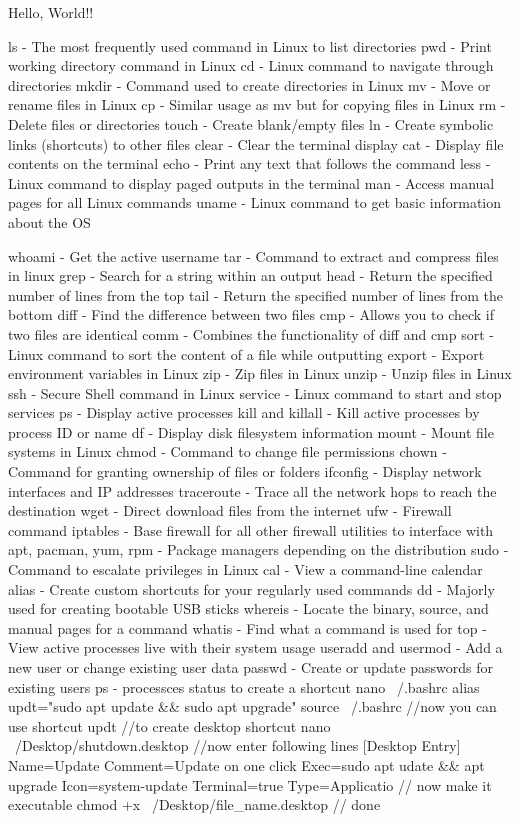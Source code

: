 \documentclass{article}  %
\begin{document}
 



Hello, World!! %

ls - The most frequently used command in Linux to list directories
pwd - Print working directory command in Linux
cd - Linux command to navigate through directories
mkdir - Command used to create directories in Linux
mv - Move or rename files in Linux
cp - Similar usage as mv but for copying files in Linux
rm - Delete files or directories
touch - Create blank/empty files
ln - Create symbolic links (shortcuts) to other files
clear - Clear the terminal display
cat - Display file contents on the terminal
echo - Print any text that follows the command
less - Linux command to display paged outputs in the terminal
man - Access manual pages for all Linux commands
uname - Linux command to get basic information about the OS

whoami - Get the active username
tar - Command to extract and compress files in linux
grep - Search for a string within an output
\vspace{2em}
head - Return the specified number of lines from the top
tail - Return the specified number of lines from the bottom
diff - Find the difference between two files
cmp - Allows you to check if two files are identical
comm - Combines the functionality of diff and cmp
sort - Linux command to sort the content of a file while outputting
export - Export environment variables in Linux
zip - Zip files in Linux
unzip - Unzip files in Linux
ssh - Secure Shell command in Linux
service - Linux command to start and stop services
ps - Display active processes
kill and killall - Kill active processes by process ID or name
df - Display disk filesystem information
mount - Mount file systems in Linux
chmod - Command to change file permissions
chown - Command for granting ownership of files or folders
ifconfig - Display network interfaces and IP addresses
traceroute - Trace all the network hops to reach the destination
wget - Direct download files from the internet
ufw - Firewall command
iptables - Base firewall for all other firewall utilities to interface with
apt, pacman, yum, rpm - Package managers depending on the distribution
sudo - Command to escalate privileges in Linux
cal - View a command-line calendar
alias - Create custom shortcuts for your regularly used commands
dd - Majorly used for creating bootable USB sticks
whereis - Locate the binary, source, and manual pages for a command
whatis - Find what a command is used for
top - View active processes live with their system usage
useradd and usermod - Add a new user or change existing user data
passwd - Create or update passwords for existing users
ps - processces status
to create a shortcut
nano ~/.bashrc
alias updt="sudo apt update \&\& sudo apt upgrade"
source ~/.bashrc
//now you can use shortcut updt
//to create desktop shortcut
nano ~/Desktop/shutdown.desktop
//now enter following lines
[Desktop Entry]
Name=Update
Comment=Update on one click
Exec=sudo apt udate \&\& apt upgrade
Icon=system-update
Terminal=true
Type=Applicatio
// now make it executable
chmod +x ~/Desktop/file_name.desktop
// done
\end{document}
